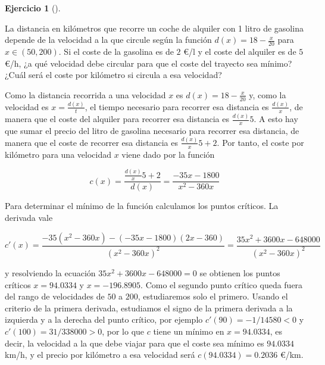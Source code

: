 \documentclass[
  a4paper,
]{scrreport}
\theoremstyle{definition}
\newtheorem{exercise}{Ejercicio}[chapter]
\theoremstyle{remark}
\begin{document}
\begin{exercise}[]\protect\hypertarget{exr-extremos-9}{}\label{exr-extremos-9}

La distancia en kilómetros que recorre un coche de alquiler con 1 litro
de gasolina depende de la velocidad a la que circule según la función
\(d(x)=18-\frac{x}{20}\) para \(x\in(50,200)\). Si el coste de la
gasolina es de \(2\) €/l y el coste del alquiler es de \(5\) €/h, ¿a qué
velocidad debe circular para que el coste del trayecto sea mínimo? ¿Cuál
será el coste por kilómetro si circula a esa velocidad?

\end{exercise}

\begin{tcolorbox}[enhanced jigsaw, coltitle=black, toptitle=1mm, colframe=quarto-callout-tip-color-frame, colbacktitle=quarto-callout-tip-color!10!white, breakable, opacityback=0, bottomtitle=1mm, opacitybacktitle=0.6, title=\textcolor{quarto-callout-tip-color}{\faLightbulb}\hspace{0.5em}{Solución}, arc=.35mm, leftrule=.75mm, toprule=.15mm, titlerule=0mm, bottomrule=.15mm, left=2mm, rightrule=.15mm, colback=white]

Como la distancia recorrida a una velocidad \(x\) es
\(d(x)=18-\frac{x}{20}\) y, como la velocidad es \(x=\frac{d(x)}{t}\),
el tiempo necesario para recorrer esa distancia es \(\frac{d(x)}{x}\),
de manera que el coste del alquiler para recorrer esa distancia es
\(\frac{d(x)}{x}5\). A esto hay que sumar el precio del litro de
gasolina necesario para recorrer esa distancia, de manera que el coste
de recorrer esa distancia es \(\frac{d(x)}{x}5+2\). Por tanto, el coste
por kilómetro para una velocidad \(x\) viene dado por la función

\[
c(x)=\frac{\frac{d(x)}{x}5+2}{d(x)} = \frac{-35x-1800}{x^2-360x}
\]

Para determinar el mínimo de la función calculamos los puntos críticos.
La derivada vale

\[
c'(x)
=\frac{-35(x^2-360x)-(-35x-1800)(2x-360)}{(x^2-360x)^2}
=\frac{35x^2+3600x-648000}{(x^2-360x)^2}
\]

y resolviendo la ecuación \(35x^2+3600x-648000=0\) se obtienen los
puntos críticos \(x=94.0334\) y \(x=-196.8905\). Como el segundo punto
crítico queda fuera del rango de velocidades de \(50\) a \(200\),
estudiaremos solo el primero. Usando el criterio de la primera derivada,
estudiamos el signo de la primera derivada a la izquierda y a la derecha
del punto crítico, por ejemplo \(c'(90)=-1/14580<0\) y
\(c'(100)=31/338000>0\), por lo que \(c\) tiene un mínimo en
\(x=94.0334\), es decir, la velocidad a la que debe viajar para que el
coste sea mínimo es \(94.0334\) km/h, y el precio por kilómetro a esa
velocidad será \(c(94.0334)=0.2036\) €/km.

\end{tcolorbox}
\end{document}
